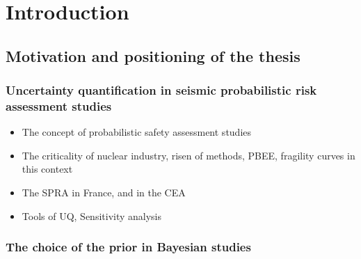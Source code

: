 

\chapter{Introduction}




\section{Motivation and positioning of the thesis}

\subsection{Uncertainty quantification in seismic probabilistic risk assessment studies}





\begin{itemize}
    \item The concept of probabilistic safety assessment studies
    \item The criticality of nuclear industry, risen of methods, PBEE, fragility curves in this context
    \item The SPRA in France, and in the CEA %
    \item Tools of UQ, Sensitivity analysis
\end{itemize}


\subsection{The choice of the prior in Bayesian studies}


